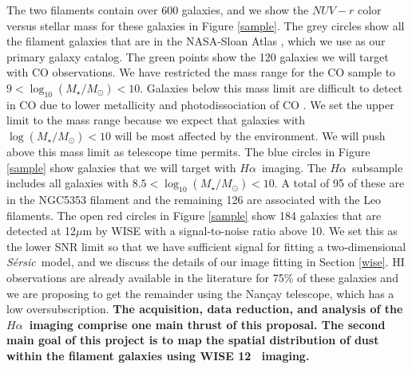 \documentclass[11pt, preprint]{aastex}
\newcommand{\ha}{$H\alpha$}
\newcommand{\sers}{{\it S\'{e}rsic}}
\begin{document}
The two filaments contain over 600 galaxies, and we show the $NUV-r$
color versus stellar mass for these galaxies in Figure \ref{sample}.
The grey circles show all the filament galaxies that are in the
NASA-Sloan Atlas \citep{blanton05}, which we use as our primary galaxy
catalog.  The green points show the 120 galaxies 
we will target with CO observations.  We have restricted the mass
range for the CO sample to $9 < \log_{10} (M_\star/M_\odot) < 10$.
Galaxies below this mass limit are difficult to detect in CO due
to lower metallicity and photodissociation of CO \citep[e.g.][]{cormier14}.  We set the
upper limit to the mass range because we expect that galaxies with
$\log (M_\star/M_\odot) < 10$ will be most affected by the
environment.  We will push above this mass limit as telescope time
permits.
The blue circles in Figure \ref{sample} show galaxies that we will
target with \ha \ imaging.   The \ha \ subsample includes all galaxies
with $8.5 < \log_{10} (M_\star/M_\odot) < 10$.  A total of 95 of these
are in the NGC5353 filament and the remaining 126 are associated with
the Leo filaments. 
The open red circles in Figure \ref{sample} show 184 galaxies that are
detected at 12$\mu$m by WISE with a signal-to-noise ratio above 10.
We set this as the lower SNR limit so that we have sufficient signal for
fitting a two-dimensional \sers \ model, and we discuss the details of
our image fitting in Section \ref{wise}.  HI observations are already available in the literature for 75\% of these galaxies and we are proposing to get the remainder using the Nan\c{c}ay telescope, which has a low oversubscription.
{\bf  The acquisition, data reduction, and analysis of
the \ha \ imaging comprise one main thrust of this proposal.
The second main goal of this project is to map the spatial
distribution of dust within the filament galaxies using WISE 12\micron
\ imaging.  }
\end{document}
